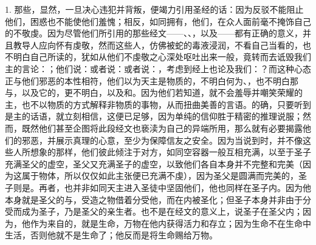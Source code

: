 1. 那些，显然，一旦决心违犯并背叛，便竭力引用圣经的话：因为反驳不能阻止他们，困惑也不能使他们羞愧；相反，如同拥有，他们，在众人面前毫不掩饰自己的不敬虔。因为尽管他们所引用的那些经文——、、，以及——都有正确的意义，并且教导人应向怀有虔敬，然而这些人，仿佛被蛇的毒液浸润，不看自己当看的，也不明白自己所读的，犹如从他们不虔敬之心深处呕吐出来一般，竟转而去诋毁我们主的言论：；他们说：或者说：或者说：，考虑到经上也论及我们：？而这种心态正与他们邪恶的本性相符，他们以为天主是物质的，不明白何为、，也不明白那与，以及它的，更不明白，以及和。因为他们若知道，就不会羞辱并嘲笑荣耀的主，也不以物质的方式解释非物质的事物，从而扭曲美善的言语。的确，只要听到是主的话语，就立刻相信，这便已足够，因为单纯的信仰胜于精密的推理说服；然而，既然他们甚至企图将此段经文也亵渎为自己的异端所用，那么就有必要揭露他们的邪恶，并展示真理的心意，至少为保障信友之安全。因为当说到时，并不像这些人所想象的那样，他们彼此倾注于对方，如同空容器一般互相充满，以至于圣子充满圣父的虚空，圣父又充满圣子的虚空，以致他们各自本身并不完整和完美（因为这属于物体，所以仅仅如此主张便已充满不虔），因为圣父是圆满而完美的，圣子则是。再者，也并非如同天主进入圣徒中坚固他们，他也同样在圣子内。因为他本身就是圣父的与，受造之物借着分受他，而在内被圣化；但圣子本身并非由于分受而成为圣子，乃是圣父的亲生者。也不是在经文的意义上，说圣子在圣父内；因为，他作为来自的，就是生命，万物在他内获得活力和存立；因为生命不在生命中生活，否则他就不是生命了；他反而是将生命赐给万物。\par

